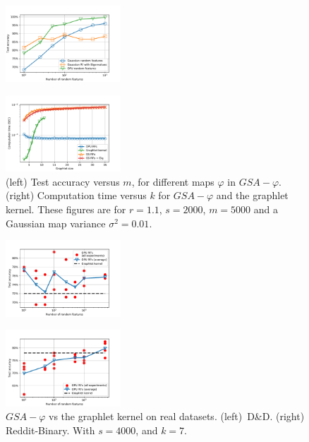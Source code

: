 \documentclass{article}
\begin{document}
\begin{figure}
	\begin{minipage}[b]{.48\linewidth}
		\centering
		\centerline{\includegraphics[width=4.3cm]{figs/phi_comparison.pdf}}
		\label{subfig:RF_maps}
	\end{minipage}
	\hfill
	\begin{minipage}[b]{0.48\linewidth}
		\centering
		\centerline{\includegraphics[width=4.3cm]{figs/computational_comp.pdf}}
	\end{minipage}
	\caption{(left) Test accuracy versus $m$, for different maps  $\varphi$ in $GSA-\varphi$. (right) Computation time versus $k$ for $GSA-\varphi$ and the graphlet kernel. These figures are for $r=1.1$, $s=2000$, $m=5000$ and a Gaussian map variance $\sigma^2=0.01$.}
	\label{fig:diff_phi}
\end{figure}


\begin{figure}
%
\begin{minipage}[b]{.48\linewidth}
  \centering
  \centerline{\includegraphics[width=4.3cm]{figs/DD.pdf}}
  \label{subfig:RF_maps}
\end{minipage}
\hfill
\begin{minipage}[b]{0.48\linewidth}
  \centering
  \centerline{\includegraphics[width=4.3cm]{figs/Reddit.pdf}}
\end{minipage}
%
\caption{$GSA-\varphi$ vs the graphlet kernel on real datasets. (left)~D\&D. (right) Reddit-Binary. With $s=4000$, and $k=7$.}
\label{fig:DD}
%
\end{figure}
\end{document}
